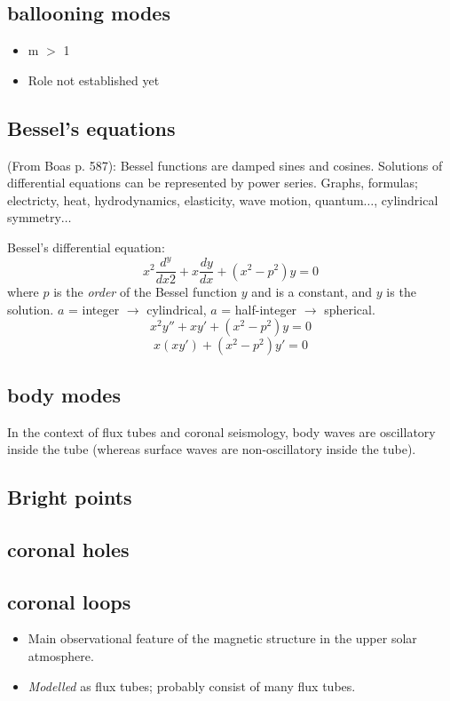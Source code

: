 \documentclass{article}
\begin{document}
\subsection{ballooning modes}
\begin{itemize}
    \item m $>$ 1

    \item Role not established yet
\end{itemize}

\subsection{Bessel's equations}

(From Boas p. 587): Bessel functions are damped sines and cosines.
Solutions of differential equations can be represented by power series.
Graphs, formulas; electricty, heat, hydrodynamics, elasticity, wave motion,
quantum$\ldots$, cylindrical symmetry$\ldots$

Bessel's differential equation:
$${ x^2\frac{d^y}{dx2} + x\frac{dy}{dx} + (x^2-p^2)y = 0 }$$
where ${p}$ is the \emph{order} of the Bessel function ${y}$ and is a constant, and
${y}$ is the solution.
${a}$ = integer $\rightarrow$ cylindrical,
${a}$ = half-integer $\rightarrow$ spherical.
$${ x^{2}y'' + xy' + (x^{2}-p^{2})y = 0  }$$
$${ x(xy') + (x^{2}-p^{2})y' = 0  }$$

\subsection{body modes}
In the context of flux tubes and coronal seismology,
body waves are oscillatory inside the tube (whereas surface waves are
non-oscillatory inside the tube).

\subsection{Bright points}

\subsection{coronal holes}

\subsection{coronal loops}
\begin{itemize}
    \item Main observational feature of the magnetic structure in the
        upper solar atmosphere.
    \item \emph{Modelled} as flux tubes; probably consist of
        many flux tubes.
\end{itemize}
\end{document}
